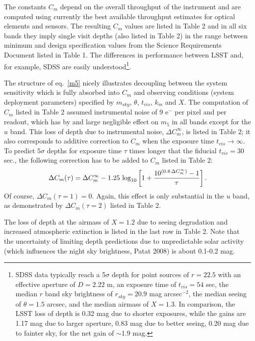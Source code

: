 \documentclass{emulateapj}
\begin{document}
The constants $C_m$ depend on the overall throughput of the instrument
and are computed using currently the best available throughput estimates for
optical elements and sensors. The resulting $C_m$ values are listed in Table 2
and in all six bands they imply single visit depths (also listed in Table 2) in the range 
between minimum and design specification values from the Science Requirements
Document listed in Table 1. 
The differences in performance between LSST and, for example, SDSS are easily 
understood\footnote{SDSS data 
typically reach a 5$\sigma$ depth for point sources of $r=22.5$ 
with an effective aperture of $D=2.22$ m, an exposure time of $t_{vis}=54$ 
sec, the median $r$ band sky brightness of $r_{sky}=20.9$ mag arcsec$^{-2}$, 
the median seeing of $\theta=1.5$ arcsec, and the median airmass of $X=1.3$.
In comparison, the LSST loss of depth is 0.32 mag due to shorter exposures,
while the gains are 1.17 mag due to larger aperture, 0.83 mag due to better 
seeing, 0.20 mag due to fainter sky, for the net gain of $\sim$1.9 mag.}.

The structure of eq.~\ref{m5} nicely illustrates decoupling between the system 
sensitivity which is fully absorbed into $C_m$ and observing conditions
(system deployment parameters) specified by $m_{sky}$, $\theta$, $t_{vis}$, $k_m$ 
and $X$. The computation of $C_m$ listed in Table 2 assumed instrumental noise of 
9 e$^-$ per pixel and per readout, which has by and large negligible effect on $m_5$ in 
all bands except for the $u$ band. This loss of depth due to instrumental noise, $\Delta C^{\infty}_m$,
is listed in Table 2; it also corresponds to additive correction to $C_m$ when the
exposure time $t_{vis} \rightarrow \infty$. To predict $5\sigma$ depths for 
exposure time $\tau$ times longer that the fiducial $t_{vis} = 30$ sec., the 
following correction has to be added to $C_m$ listed in Table 2:
\begin{equation}
\label{eq:DCm} 
 \Delta C_m(\tau) = \Delta C^\infty_m - 1.25\,\log_{10}\left[1 + {10^{(0.8 \, \Delta C^\infty_m)} - 1 \over \tau}  \right].
\end{equation}
Of course, $\Delta C_m(\tau=1)=0$. Again, this effect is only substantial in the $u$ 
band, as demonstrated by $\Delta C_m(\tau = 2)$ listed in Table 2.  

The loss of depth at the airmass of $X=1.2$ due to seeing degradation 
and increased atmospheric extinction is listed in the last row in Table 2. Note
that the uncertainty of limiting depth predictions due to unpredictable solar 
activity (which influences the night sky brightness, Patat 2008) is about 
0.1-0.2 mag. 
\end{document}
